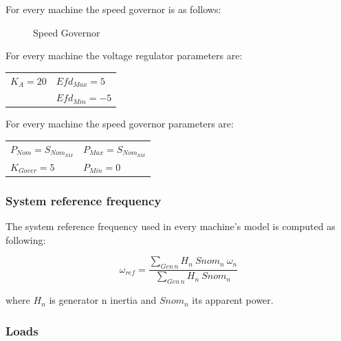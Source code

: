 \documentclass[a4paper, 12pt]{report}
\begin{document}
For every machine the speed governor is as follows:
\begin{figure}[H]
\centering
{}
\caption{Speed Governor}
\end{figure}

For every machine the voltage regulator parameters are:
\begin{center}
\begin{tabular}{l|l}
   $K_A=20$ & $Efd_{Max}=5$  \\
    & $Efd_{Min}=-5$   \\
\end{tabular}
\end{center}

For every machine the speed governor parameters are:
\begin{center}
\begin{tabular}{l|l}
   $P_{Nom}=S_{Nom_{SM}}$ & $P_{Max}=S_{Nom_{SM}}$  \\
   $K_{Gover}=5$ & $P_{Min}=0$   \\
\end{tabular}
\end{center}

\subsubsection{System reference frequency}

The system reference frequency used in every machine's model is computed as following:

\[
 \omega_{ref} = \frac{\sum_{Gen \hspace{2pt} n} H_{n} \ Snom_{n} \ \omega_{n}}{\sum_{Gen \hspace{2pt} n} H_{n} \ Snom_{n}}
\]

where $H_{n}$ is generator n inertia and $Snom_{n}$ its apparent power.
\subsubsection{Loads}
\end{document}
